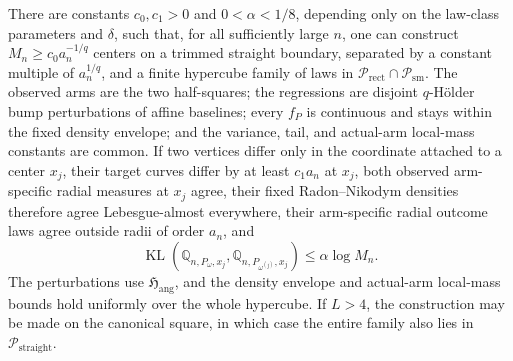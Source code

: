 There are constants \(c_0,c_1>0\) and \(0<\alpha<1/8\), depending only on the law-class parameters and \(\delta\), such that, for all sufficiently large \(n\), one can construct \(M_n\geq c_0a_n^{-1/q}\) centers on a trimmed straight boundary, separated by a constant multiple of \(a_n^{1/q}\), and a finite hypercube family of laws in \(\mathcal P_{\mathrm{rect}}\cap\mathcal P_{\mathrm{sm}}\).  The observed arms are the two half-squares; the regressions are disjoint \(q\)-H\"older bump perturbations of affine baselines; every \(f_P\) is continuous and stays within the fixed density envelope; and the variance, tail, and actual-arm local-mass constants are common.  If two vertices differ only in the coordinate attached to a center \(x_j\), their target curves differ by at least \(c_1a_n\) at \(x_j\), both observed arm-specific radial measures at \(x_j\) agree, their fixed Radon--Nikodym densities therefore agree Lebesgue-almost everywhere, their arm-specific radial outcome laws agree outside radii of order \(a_n\), and
\[
 \operatorname{KL}\!\left(\mathbb Q_{n,P_\omega,x_j},\mathbb Q_{n,P_{\omega^{(j)}},x_j}\right)
 \leq\alpha\log M_n.
\]
The perturbations use \(\mathfrak H_{\mathrm{ang}}\), and the density envelope and actual-arm local-mass bounds hold uniformly over the whole hypercube.  If \(L>4\), the construction may be made on the canonical square, in which case the entire family also lies in \(\mathcal P_{\mathrm{straight}}\).